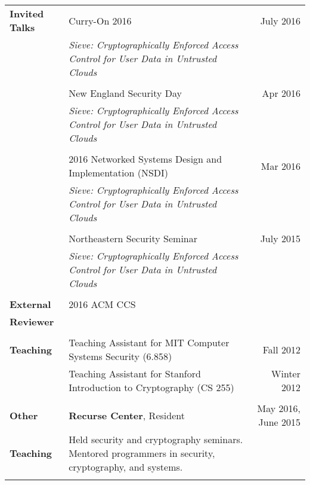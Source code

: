\documentclass[a4paper,10pt]{article}
\begin{document}
\begin{tabular*}{0.95 \textwidth} { p{0.9in} l @{\extracolsep{\fill}} r}

\textbf{Invited Talks} & Curry-On 2016 & July 2016 \\
& \begin{minipage}[t]{0.6 \textwidth} 
\textit{Sieve: Cryptographically Enforced Access Control for User Data in Untrusted Clouds} \end{minipage} & \\ \\
& New England Security Day & Apr 2016 \\
& \begin{minipage}[t]{0.6 \textwidth}
\textit{Sieve: Cryptographically Enforced Access Control for User Data in Untrusted Clouds} \end{minipage} & \\ \\
& 2016 Networked Systems Design and Implementation (NSDI) & Mar 2016 \\
& \begin{minipage}[t]{0.6 \textwidth} 
\textit{Sieve: Cryptographically Enforced Access Control for User Data in Untrusted Clouds} \end{minipage} & \\ \\
& Northeastern Security Seminar & July 2015 \\
& \begin{minipage}[t]{0.6 \textwidth} \textit{Sieve: Cryptographically Enforced Access Control for User Data in Untrusted Clouds} \end{minipage} & \\ \\

\textbf{External} & 2016 ACM CCS & \\
\textbf{Reviewer} & & \\ \\

\textbf{Teaching} 
& Teaching Assistant for MIT Computer Systems Security (6.858) & Fall 2012 \\
& Teaching Assistant for Stanford Introduction to Cryptography (CS 255) & Winter 2012 \\ \\

\textbf{Other} & \textbf{Recurse Center}, Resident & May 2016, June 2015 \\ 
\textbf{Teaching} & \begin{minipage}[t]{0.5 \textwidth} 
Held security and cryptography seminars. Mentored programmers 
in security, cryptography, and systems. 
\end{minipage} \\ \\


\end{tabular*}
\end{document}
